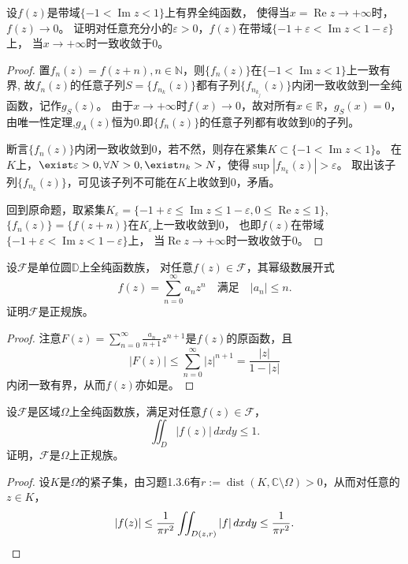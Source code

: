 \begin{3}
设$f(z)$是带域$\{-1<\operatorname{Im}z<1\}$上有界全纯函数，
使得当$x=\operatorname{Re}z\rightarrow +\infty$时，$f(z)\rightarrow 0$。
证明对任意充分小的$\varepsilon>0$，$f(z)$在带域$\{-1+\varepsilon<\operatorname{Im}z<1-\varepsilon\}$上，
当$x\rightarrow+\infty$时一致收敛于$0$。
\end{3}
\begin{proof}
    置$f_n(z)=f(z+n),n\in\mathbb{N}$，则$\{f_n(z)\}$在$\{-1<\operatorname{Im}z<1\}$上一致有界,
    故${f_n(z)}$的任意子列$S=\{f_{n_k}(z)\}$都有子列$\{f_{n_{k_j}}(z)\}$内闭一致收敛到一全纯函数，记作$g_S(z)$。
    由于$x\rightarrow+\infty$时$f(x)\rightarrow0$，故对所有$x\in\mathbb{R}$，$g_S(x)=0$，
    由唯一性定理,$g_A(z)$恒为$0$.即$\{f_n(z)\}$的任意子列都有收敛到$0$的子列。

    断言$\{f_n(z)\}$内闭一致收敛到$0$，若不然，则存在紧集$K\subset\{-1<\operatorname{Im}z<1\}$。
    在$K$上，$\exist \varepsilon>0,\forall N>0,\exist n_k>N$，使得$\sup |f_{n_k}(z)|>\varepsilon$。
    取出该子列$\{f_{n_k}(z)\}$，可见该子列不可能在$K$上收敛到$0$，矛盾。

    回到原命题，取紧集$K_{\varepsilon}=\{-1+\varepsilon\leqslant\operatorname{Im}z\leqslant1-\varepsilon,0\leqslant\operatorname{Re}z\leqslant1\}$,
    $\{f_n(z)\}=\{f(z+n)\}$在$K_\varepsilon$上一致收敛到$0$，
    也即$f(z)$在带域$\{-1+\varepsilon<\operatorname{Im}z<1-\varepsilon\}$上，
    当$\operatorname{Re}z\rightarrow+\infty$时一致收敛于$0$。
\end{proof}

\begin{4}
    设$\mathcal{F}$是单位圆$\mathbb{D}$上全纯函数族，
    对任意$f(z)\in\mathcal{F}$，其幂级数展开式
    \[f(z)=\sum_{n=0}^{\infty}a_nz^n\quad\text{满足}\quad|a_n| \le n.\]
    证明$\mathcal{F}$是正规族。
\end{4}
\begin{proof}
    注意$\displaystyle F(z)=\sum_{n=0}^\infty\frac{a_n}{n+1}z^{n+1}$是$f(z)$的原函数，且
    \[|F(z)|\le\sum_{n=0}^\infty|z|^{n+1}=\frac{|z|}{1-|z|}\]
    内闭一致有界，从而$f(z)$亦如是。
\end{proof}
\begin{5}
    设$\mathcal{F}$是区域$\Omega$上全纯函数族，满足对任意$f(z)\in\mathcal{F}$，
    \[\iint_D|f(z)|\,dxdy\le1.\]
    证明，$\mathcal{F}$是$\Omega$上正规族。
\end{5}
\begin{proof}
    设$K$是$\Omega$的紧子集，由习题1.3.6有$r:=\operatorname{dist}(K,\mathbb{C}\setminus\Omega)>0$，从而对任意的$z \in K$，
    \[|f(z)|\le\frac{1}{\pi r^2}\iint_{D(z,r)}|f|\,dxdy\le\frac{1}{\pi r^2}.\qedhere\]
\end{proof}

